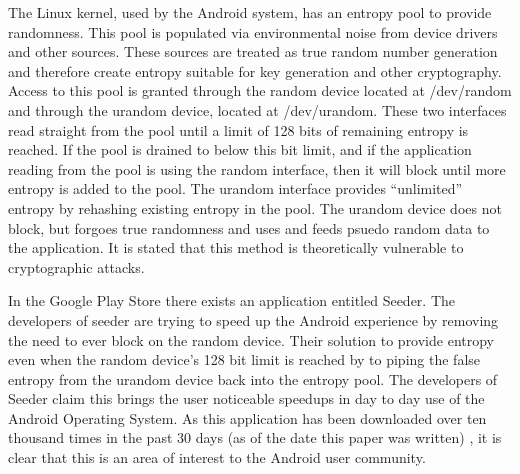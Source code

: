 \documentclass[conference]{IEEEtran}
\begin{document}
The Linux kernel, used by the Android system, has an entropy pool to provide randomness. This pool is populated via environmental noise from device drivers and other 
sources. These sources are treated as true random number generation and therefore create entropy suitable for key generation and other
cryptography. Access to this pool is granted through the random device located at /dev/random \cite{random_man} and through the urandom device, 
located at /dev/urandom. These two interfaces read straight from the pool until a limit of 128 bits of remaining entropy is reached. If the pool is drained to below this bit limit, and if the application reading from the pool is using the random interface, then it will block until more entropy is added to the pool. The urandom interface provides ``unlimited'' entropy by rehashing existing entropy in the pool. The urandom device does not block, but forgoes true randomness and uses and feeds psuedo random data to the application. It is stated that this method is theoretically vulnerable to cryptographic attacks. 

In the Google Play Store there exists an application entitled Seeder. The developers of seeder are trying to speed up the Android experience by removing
the need to ever block on the random device. Their solution to provide entropy even when the random device's 128 bit limit is reached by to piping the 
false entropy from the urandom device back into the entropy pool. The developers of Seeder claim this brings the user noticeable speedups in day to 
day use of the Android Operating System. As this application has been downloaded over ten thousand times in the past 30 days (as of the date this paper was written)
, it is clear that this is an area of interest to the Android user community.
\end{document}
